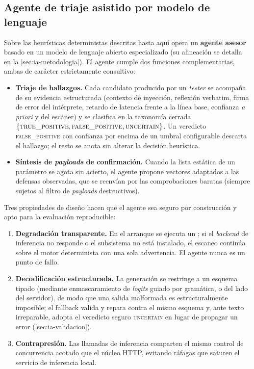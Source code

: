 \subsection{Agente de triaje asistido por modelo de lenguaje}
\label{sec:agente}

Sobre las heurísticas deterministas descritas hasta aquí opera un \textbf{agente
asesor} basado en un modelo de lenguaje abierto especializado (su alineación se
detalla en la \cref{sec:ia-metodologia}). El agente cumple dos funciones
complementarias, ambas de carácter estrictamente consultivo:

\begin{itemize}
  \item \textbf{Triaje de hallazgos.} Cada candidato producido por un
  \emph{tester} se acompaña de su evidencia estructurada (contexto de
  inyección, reflexión verbatim, firma de error del intérprete, retardo de
  latencia frente a la línea base, confianza \emph{a priori} y del escáner) y
  se clasifica en la taxonomía cerrada
  $\{\textsc{true\_positive},\allowbreak \textsc{false\_positive},\allowbreak
  \textsc{uncertain}\}$. Un veredicto \textsc{false\_positive} con confianza
  por encima de un umbral configurable descarta el hallazgo; el resto se anota
  sin alterar la decisión heurística.
  \item \textbf{Síntesis de \emph{payloads} de confirmación.} Cuando la lista
  estática de un parámetro se agota sin acierto, el agente propone vectores
  adaptados a las defensas observadas, que se reenvían por las comprobaciones
  baratas (siempre sujetos al filtro de \emph{payloads} destructivos).
\end{itemize}

Tres propiedades de diseño hacen que el agente sea seguro por construcción y
apto para la evaluación reproducible:

\begin{enumerate}
  \item \textbf{Degradación transparente.} En el arranque se ejecuta un
  ; si el \emph{backend} de inferencia no responde o el
  subsistema no está instalado, el escaneo continúa sobre el motor
  determinista con una sola advertencia. El agente nunca es un punto de fallo.
  \item \textbf{Decodificación estructurada.} La generación se restringe a un
  esquema tipado (mediante enmascaramiento de \emph{logits} guiado por
  gramática, o  del lado del servidor), de modo que una
  salida malformada es estructuralmente imposible; el fallback valida y repara
  contra el mismo esquema y, ante texto irreparable, adopta el veredicto seguro
  \textsc{uncertain} en lugar de propagar un error (\cref{sec:ia-validacion}).
  \item \textbf{Contrapresión.} Las llamadas de inferencia comparten el mismo
  control de concurrencia acotado que el núcleo HTTP, evitando ráfagas que
  saturen el servicio de inferencia local.
\end{enumerate}


